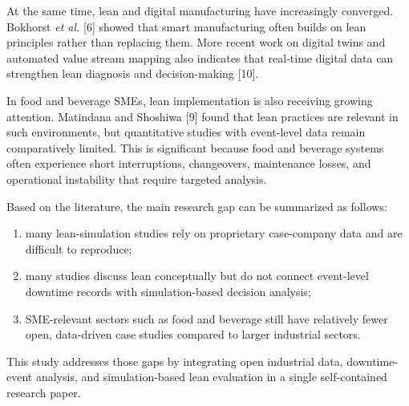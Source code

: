 \documentclass[12pt,a4paper]{article}
\begin{document}
At the same time, lean and digital manufacturing have increasingly converged. Bokhorst \emph{et al.} [6] showed that smart manufacturing often builds on lean principles rather than replacing them. More recent work on digital twins and automated value stream mapping also indicates that real-time digital data can strengthen lean diagnosis and decision-making [10].

In food and beverage SMEs, lean implementation is also receiving growing attention. Matindana and Shoshiwa [9] found that lean practices are relevant in such environments, but quantitative studies with event-level data remain comparatively limited. This is significant because food and beverage systems often experience short interruptions, changeovers, maintenance losses, and operational instability that require targeted analysis.

Based on the literature, the main research gap can be summarized as follows:
\begin{enumerate}
    \item many lean-simulation studies rely on proprietary case-company data and are difficult to reproduce;
    \item many studies discuss lean conceptually but do not connect event-level downtime records with simulation-based decision analysis;
    \item SME-relevant sectors such as food and beverage still have relatively fewer open, data-driven case studies compared to larger industrial sectors.
\end{enumerate}

This study addresses those gaps by integrating open industrial data, downtime-event analysis, and simulation-based lean evaluation in a single self-contained research paper.
\end{document}
